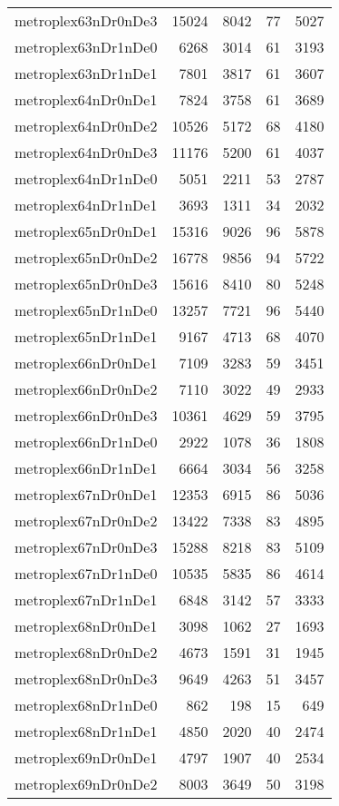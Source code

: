 \documentclass[../../../thesis.tex]{subfiles}
\begin{document}
\begin{longtable}{lrrrr}
metroplex63nDr0nDe3 & 15024 & 8042 & 77 & 5027 \\
metroplex63nDr1nDe0 & 6268 & 3014 & 61 & 3193 \\
metroplex63nDr1nDe1 & 7801 & 3817 & 61 & 3607 \\
metroplex64nDr0nDe1 & 7824 & 3758 & 61 & 3689 \\
metroplex64nDr0nDe2 & 10526 & 5172 & 68 & 4180 \\
metroplex64nDr0nDe3 & 11176 & 5200 & 61 & 4037 \\
metroplex64nDr1nDe0 & 5051 & 2211 & 53 & 2787 \\
metroplex64nDr1nDe1 & 3693 & 1311 & 34 & 2032 \\
metroplex65nDr0nDe1 & 15316 & 9026 & 96 & 5878 \\
metroplex65nDr0nDe2 & 16778 & 9856 & 94 & 5722 \\
metroplex65nDr0nDe3 & 15616 & 8410 & 80 & 5248 \\
metroplex65nDr1nDe0 & 13257 & 7721 & 96 & 5440 \\
metroplex65nDr1nDe1 & 9167 & 4713 & 68 & 4070 \\
metroplex66nDr0nDe1 & 7109 & 3283 & 59 & 3451 \\
metroplex66nDr0nDe2 & 7110 & 3022 & 49 & 2933 \\
metroplex66nDr0nDe3 & 10361 & 4629 & 59 & 3795 \\
metroplex66nDr1nDe0 & 2922 & 1078 & 36 & 1808 \\
metroplex66nDr1nDe1 & 6664 & 3034 & 56 & 3258 \\
metroplex67nDr0nDe1 & 12353 & 6915 & 86 & 5036 \\
metroplex67nDr0nDe2 & 13422 & 7338 & 83 & 4895 \\
metroplex67nDr0nDe3 & 15288 & 8218 & 83 & 5109 \\
metroplex67nDr1nDe0 & 10535 & 5835 & 86 & 4614 \\
metroplex67nDr1nDe1 & 6848 & 3142 & 57 & 3333 \\
metroplex68nDr0nDe1 & 3098 & 1062 & 27 & 1693 \\
metroplex68nDr0nDe2 & 4673 & 1591 & 31 & 1945 \\
metroplex68nDr0nDe3 & 9649 & 4263 & 51 & 3457 \\
metroplex68nDr1nDe0 & 862 & 198 & 15 & 649 \\
metroplex68nDr1nDe1 & 4850 & 2020 & 40 & 2474 \\
metroplex69nDr0nDe1 & 4797 & 1907 & 40 & 2534 \\
metroplex69nDr0nDe2 & 8003 & 3649 & 50 & 3198 \\

\end{longtable}
\end{document}
